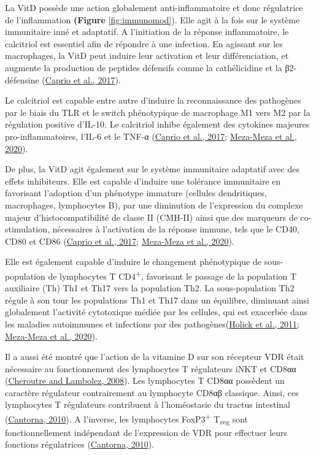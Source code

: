 \documentclass[
  a4paper,
  DIV=11,
  numbers=noendperiod,
  listof=totoc]{scrreprt}
\begin{document}
La VitD possède une action globalement anti-inflammatoire et donc
régulatrice de l'inflammation \textbf{(Figure} \ref{fig:immunomod}).
Elle agit à la fois sur le système immunitaire inné et adaptatif. A
l'initiation de la réponse inflammatoire, le calcitriol est essentiel
afin de répondre à une infection. En agissant sur les macrophages, la
VitD peut induire leur activation et leur différenciation, et augmente
la production de peptides défensifs comme la cathélicidine et la
β2-défensine (\protect\hyperlink{ref-Caprio.2017}{Caprio et al., 2017}).

Le calcitriol est capable entre autre d'induire la reconnaissance des
pathogènes par le biais du TLR et le switch phénotypique de macrophage
M1 vers M2 par la régulation positive d'IL-10. Le calcitriol inhibe
également des cytokines majeures pro-inflammatoires, l'IL-6 et le TNF-α
(\protect\hyperlink{ref-Caprio.2017}{Caprio et al., 2017};
\protect\hyperlink{ref-Meza-Meza.2020}{Meza-Meza et al., 2020}).

De plus, la VitD agit également sur le système immunitaire adaptatif
avec des effets inhibiteurs. Elle est capable d'induire une tolérance
immunitaire en favorisant l'adoption d'un phénotype immature (cellules
dendritiques, macrophages, lymphocytes B), par une diminution de
l'expression du complexe majeur d'histocompatibilité de classe II
(CMH-II) ainsi que des marqueurs de co-stimulation, nécessaires à
l'activation de la réponse immune, tels que le CD40, CD80 et CD86
(\protect\hyperlink{ref-Caprio.2017}{Caprio et al., 2017};
\protect\hyperlink{ref-Meza-Meza.2020}{Meza-Meza et al., 2020}).

Elle est également capable d'induire le changement phénotypique de
sous-population de lymphocytes T CD4\textsuperscript{+}, favorisant le
passage de la population T auxiliaire (Th) Th1 et Th17 vers la
population Th2. La sous-population Th2 régule à son tour les populations
Th1 et Th17 dans un équilibre, diminuant ainsi globalement l'activité
cytotoxique médiée par les cellules, qui est exacerbée dans les maladies
autoimmunes et infections par des
pathogènes(\protect\hyperlink{ref-Holick.2011}{Holick et al., 2011};
\protect\hyperlink{ref-Meza-Meza.2020}{Meza-Meza et al., 2020}).

Il a aussi été montré que l'action de la vitamine D sur son récepteur
VDR était nécessaire au fonctionnement des lymphocytes T régulateurs
iNKT et CD8αα (\protect\hyperlink{ref-Cheroutre.2008}{Cheroutre and
Lambolez, 2008}). Les lymphocytes T CD8αα possèdent un caractère
régulateur contrairement au lymphocyte CD8αβ classique. Ainsi, ces
lymphocytes T régulateurs contribuent à l'homéostasie du tractus
intestinal (\protect\hyperlink{ref-Cantorna.2010}{Cantorna, 2010}). A
l'inverse, les lymphocytes FoxP3\textsuperscript{+} T\textsubscript{reg}
sont fonctionnellement indépendant de l'expression de VDR pour effectuer
leurs fonctions régulatrices
(\protect\hyperlink{ref-Cantorna.2010}{Cantorna, 2010}).
\end{document}
